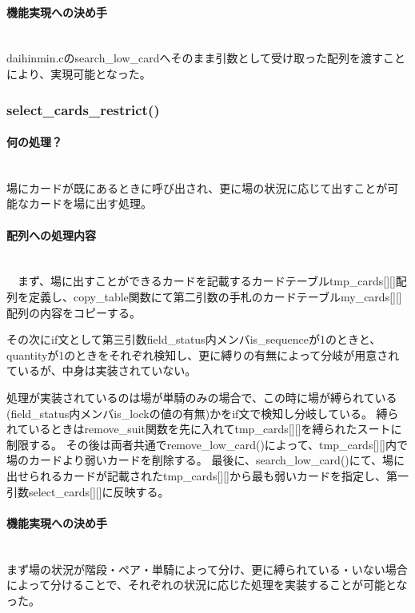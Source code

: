 \documentclass[11pt,a4paper, uplatex]{jsarticle}
\begin{document}
\paragraph{機能実現への決め手}\mbox{}\\
daihinmin.cのsearch\_low\_cardへそのまま引数として受け取った配列を渡すことにより、実現可能となった。
%
\subsubsection{select\_cards\_restrict()}
\paragraph{何の処理？}\mbox{}\\
場にカードが既にあるときに呼び出され、更に場の状況に応じて出すことが可能なカードを場に出す処理。
\paragraph{配列への処理内容}\mbox{}\\
　まず、場に出すことができるカードを記載するカードテーブルtmp\_cards[][]配列を定義し、copy\_table関数にて第二引数の手札のカードテーブルmy\_cards[][]配列の内容をコピーする。

その次にif文として第三引数field\_status内メンバis\_sequenceが1のときと、quantityが1のときをそれぞれ検知し、更に縛りの有無によって分岐が用意されているが、中身は実装されていない。

処理が実装されているのは場が単騎のみの場合で、この時に場が縛られている(field\_status内メンバis\_lockの値の有無)かをif文で検知し分岐している。
縛られているときはremove\_suit関数を先に入れてtmp\_cards[][]を縛られたスートに制限する。
その後は両者共通でremove\_low\_card()によって、tmp\_cards[][]内で場のカードより弱いカードを削除する。
最後に、search\_low\_card()にて、場に出せられるカードが記載されたtmp\_cards[][]から最も弱いカードを指定し、第一引数select\_cards[][]に反映する。
\paragraph{機能実現への決め手}\mbox{}\\
まず場の状況が階段・ペア・単騎によって分け、更に縛られている・いない場合によって分けることで、それぞれの状況に応じた処理を実装することが可能となった。
%
\end{document}
